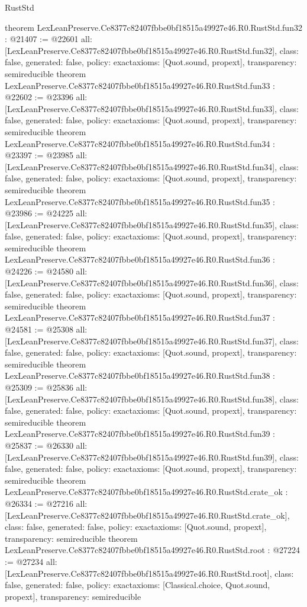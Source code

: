 \begin{lexlean}{RustStd}
\begin{coremodule}
{}
theorem LexLeanPreserve.Ce8377c82407fbbe0bf18515a49927e46.R0.RustStd.fun32 : @21407 := @22601 {
  all: [LexLeanPreserve.Ce8377c82407fbbe0bf18515a49927e46.R0.RustStd.fun32],
  class: false,
  generated: false,
  policy: exact{axioms: [Quot.sound, propext]},
  transparency: semireducible
}
theorem LexLeanPreserve.Ce8377c82407fbbe0bf18515a49927e46.R0.RustStd.fun33 : @22602 := @23396 {
  all: [LexLeanPreserve.Ce8377c82407fbbe0bf18515a49927e46.R0.RustStd.fun33],
  class: false,
  generated: false,
  policy: exact{axioms: [Quot.sound, propext]},
  transparency: semireducible
}
theorem LexLeanPreserve.Ce8377c82407fbbe0bf18515a49927e46.R0.RustStd.fun34 : @23397 := @23985 {
  all: [LexLeanPreserve.Ce8377c82407fbbe0bf18515a49927e46.R0.RustStd.fun34],
  class: false,
  generated: false,
  policy: exact{axioms: [Quot.sound, propext]},
  transparency: semireducible
}
theorem LexLeanPreserve.Ce8377c82407fbbe0bf18515a49927e46.R0.RustStd.fun35 : @23986 := @24225 {
  all: [LexLeanPreserve.Ce8377c82407fbbe0bf18515a49927e46.R0.RustStd.fun35],
  class: false,
  generated: false,
  policy: exact{axioms: [Quot.sound, propext]},
  transparency: semireducible
}
theorem LexLeanPreserve.Ce8377c82407fbbe0bf18515a49927e46.R0.RustStd.fun36 : @24226 := @24580 {
  all: [LexLeanPreserve.Ce8377c82407fbbe0bf18515a49927e46.R0.RustStd.fun36],
  class: false,
  generated: false,
  policy: exact{axioms: [Quot.sound, propext]},
  transparency: semireducible
}
theorem LexLeanPreserve.Ce8377c82407fbbe0bf18515a49927e46.R0.RustStd.fun37 : @24581 := @25308 {
  all: [LexLeanPreserve.Ce8377c82407fbbe0bf18515a49927e46.R0.RustStd.fun37],
  class: false,
  generated: false,
  policy: exact{axioms: [Quot.sound, propext]},
  transparency: semireducible
}
theorem LexLeanPreserve.Ce8377c82407fbbe0bf18515a49927e46.R0.RustStd.fun38 : @25309 := @25836 {
  all: [LexLeanPreserve.Ce8377c82407fbbe0bf18515a49927e46.R0.RustStd.fun38],
  class: false,
  generated: false,
  policy: exact{axioms: [Quot.sound, propext]},
  transparency: semireducible
}
theorem LexLeanPreserve.Ce8377c82407fbbe0bf18515a49927e46.R0.RustStd.fun39 : @25837 := @26330 {
  all: [LexLeanPreserve.Ce8377c82407fbbe0bf18515a49927e46.R0.RustStd.fun39],
  class: false,
  generated: false,
  policy: exact{axioms: [Quot.sound, propext]},
  transparency: semireducible
}
theorem LexLeanPreserve.Ce8377c82407fbbe0bf18515a49927e46.R0.RustStd.crate_ok : @26334 := @27216 {
  all: [LexLeanPreserve.Ce8377c82407fbbe0bf18515a49927e46.R0.RustStd.crate_ok],
  class: false,
  generated: false,
  policy: exact{axioms: [Quot.sound, propext]},
  transparency: semireducible
}
theorem LexLeanPreserve.Ce8377c82407fbbe0bf18515a49927e46.R0.RustStd.root : @27224 := @27234 {
  all: [LexLeanPreserve.Ce8377c82407fbbe0bf18515a49927e46.R0.RustStd.root],
  class: false,
  generated: false,
  policy: exact{axioms: [Classical.choice, Quot.sound, propext]},
  transparency: semireducible
}


\end{coremodule}
\end{lexlean}
